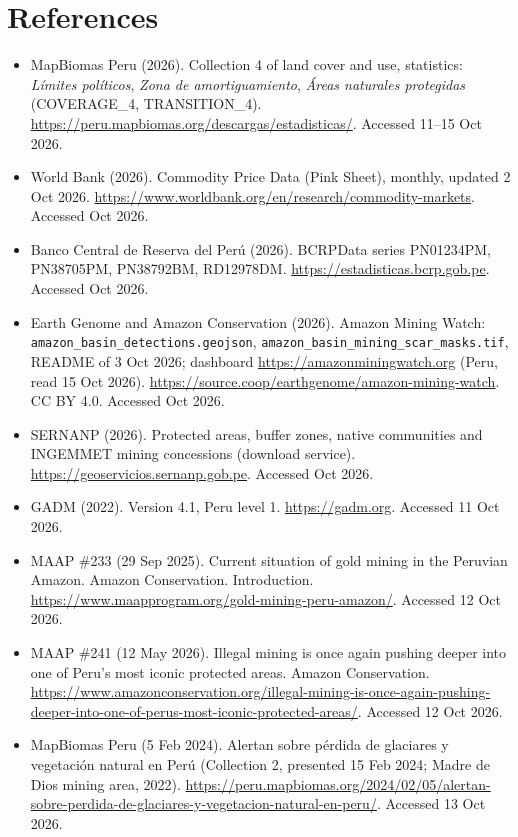 \documentclass[10pt,a4paper]{article}
\begin{document}
\section*{References}
{\small
\begin{itemize}
\item MapBiomas Peru (2026). Collection 4 of land cover and use, statistics: \emph{Límites políticos}, \emph{Zona de amortiguamiento}, \emph{Áreas naturales protegidas} (COVERAGE\_4, TRANSITION\_4). \url{https://peru.mapbiomas.org/descargas/estadisticas/}. Accessed 11--15 Oct 2026.
\item World Bank (2026). Commodity Price Data (Pink Sheet), monthly, updated 2 Oct 2026. \url{https://www.worldbank.org/en/research/commodity-markets}. Accessed Oct 2026.
\item Banco Central de Reserva del Perú (2026). BCRPData series PN01234PM, PN38705PM, PN38792BM, RD12978DM. \url{https://estadisticas.bcrp.gob.pe}. Accessed Oct 2026.
\item Earth Genome and Amazon Conservation (2026). Amazon Mining Watch: \nolinkurl{amazon_basin_detections.geojson}, \nolinkurl{amazon_basin_mining_scar_masks.tif}, README of 3 Oct 2026; dashboard \url{https://amazonminingwatch.org} (Peru, read 15 Oct 2026). \url{https://source.coop/earthgenome/amazon-mining-watch}. CC BY 4.0. Accessed Oct 2026.
\item SERNANP (2026). Protected areas, buffer zones, native communities and INGEMMET mining concessions (download service). \url{https://geoservicios.sernanp.gob.pe}. Accessed Oct 2026.
\item GADM (2022). Version 4.1, Peru level 1. \url{https://gadm.org}. Accessed 11 Oct 2026.
\item MAAP \#233 (29 Sep 2025). Current situation of gold mining in the Peruvian Amazon. Amazon Conservation. Introduction. \url{https://www.maapprogram.org/gold-mining-peru-amazon/}. Accessed 12 Oct 2026.
\item MAAP \#241 (12 May 2026). Illegal mining is once again pushing deeper into one of Peru's most iconic protected areas. Amazon Conservation. \url{https://www.amazonconservation.org/illegal-mining-is-once-again-pushing-deeper-into-one-of-perus-most-iconic-protected-areas/}. Accessed 12 Oct 2026.
\item MapBiomas Peru (5 Feb 2024). Alertan sobre pérdida de glaciares y vegetación natural en Perú (Collection 2, presented 15 Feb 2024; Madre de Dios mining area, 2022). \url{https://peru.mapbiomas.org/2024/02/05/alertan-sobre-perdida-de-glaciares-y-vegetacion-natural-en-peru/}. Accessed 13 Oct 2026.

\end{itemize}}
\end{document}
